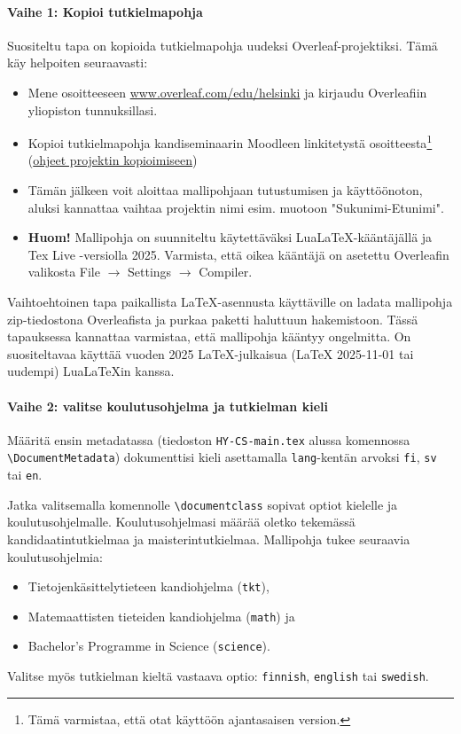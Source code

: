 \documentclass[finnish, manual, a4paper]{csthesis}
\begin{document}
\paragraph{Vaihe 1: Kopioi tutkielmapohja}
Suositeltu tapa on kopioida tutkielmapohja uudeksi Overleaf-projektiksi. Tämä käy helpoiten seuraavasti:
\begin{itemize}
    \item Mene osoitteeseen \href{http://www.overleaf.com/edu/helsinki}{www.overleaf.com/edu/helsinki} ja kirjaudu Overleafiin yli\-opiston tunnuksillasi.
    \item Kopioi tutkielmapohja kandiseminaarin Moodleen linkitetystä osoitteesta\footnote{Tämä varmistaa, että otat käyttöön ajantasaisen version. } (\href{https://docs.overleaf.com/managing-projects-and-files/copying-a-project}{ohjeet projektin kopioimiseen})
    \item Tämän jälkeen voit aloittaa mallipohjaan tutustumisen ja käyttöönoton, aluksi kannattaa vaihtaa projektin nimi esim. muotoon "Sukunimi-Etunimi".
    \item {\bf Huom!} Mallipohja on suunniteltu käytettäväksi LuaLaTeX-kääntäjällä ja Tex Live -versiolla 2025. Varmista, että oikea kääntäjä on asetettu Overleafin valikosta File $\rightarrow$ Settings $\rightarrow$ Compiler. 
\end{itemize}
Vaihtoehtoinen tapa paikallista \LaTeX-asennusta käyttäville on ladata mallipohja zip-tiedostona Overleafista ja purkaa paketti haluttuun hakemistoon. Tässä tapauksessa kannattaa varmistaa, että mallipohja kääntyy ongelmitta. 
On suositeltavaa käyttää vuoden 2025 LaTeX-julkaisua (LaTeX 2025-11-01 tai uudempi) LuaLaTeXin kanssa.

\paragraph{Vaihe 2: valitse koulutusohjelma ja tutkielman kieli}
Määritä ensin metadatassa (tiedoston \texttt{HY-CS-main.tex} alussa komennossa
\texttt{\textbackslash DocumentMetadata}) dokumenttisi kieli asettamalla \texttt{lang}-kentän arvoksi \texttt{fi}, \texttt{sv} tai \texttt{en}.  

Jatka valitsemalla komennolle \texttt{\textbackslash documentclass} sopivat optiot kielelle ja koulutusohjelmalle. Koulutusohjelmasi määrää oletko tekemässä kandidaatintutkielmaa ja maisterintutkielmaa. 
Mallipohja tukee seuraavia koulutusohjelmia: 
\begin{itemize}
\item Tietojenkäsittelytieteen kandiohjelma (\texttt{tkt}), 
\item Matemaattisten tieteiden kandiohjelma (\texttt{math}) ja
\item Bachelor's Programme in Science (\texttt{science}).
\end{itemize}
Valitse myös tutkielman kieltä vastaava optio: \texttt{finnish}, \texttt{english} tai \texttt{swedish}. 
\end{document}
